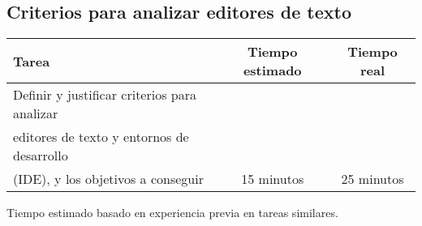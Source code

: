 \documentclass[12pt,a4paper]{article}
\begin{document}
\subsection{Criterios para analizar editores de texto}
    \begin{center}
        \begin{tabular}{|l|c|c|}
            \hline
            \textbf{Tarea} & \textbf{Tiempo estimado} & \textbf{Tiempo real} \\
            \hline
            Definir y justificar criterios para analizar 
\\editores de texto y entornos de desarrollo 
\\(IDE), y los objetivos a conseguir & 15 minutos & 25 minutos \\
            \hline
        \end{tabular}
    \end{center}
    \begin{center}
        Tiempo estimado basado en experiencia previa en tareas similares.
    \end{center}
\end{document}
